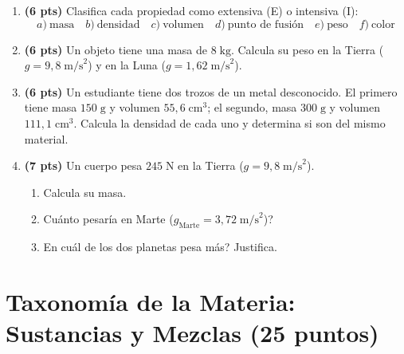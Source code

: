 \documentclass[12pt, letterpaper]{article}
\begin{document}
\begin{enumerate}[leftmargin=*]
  \item \textbf{(6 pts)} Clasifica cada propiedad como extensiva (E) o intensiva (I):
        \[
          a)\ \text{masa} \quad b)\ \text{densidad} \quad c)\ \text{volumen} \quad d)\ \text{punto de fusión} \quad e)\ \text{peso} \quad f)\ \text{color}
        \]

  \item \textbf{(6 pts)} Un objeto tiene una masa de $8\;\text{kg}$. Calcula su peso en la Tierra ($g = 9{,}8\;\text{m/s}^2$) y en la Luna ($g = 1{,}62\;\text{m/s}^2$).

  \item \textbf{(6 pts)} Un estudiante tiene dos trozos de un metal desconocido. El primero tiene masa $150\;\text{g}$ y volumen $55{,}6\;\text{cm}^3$; el segundo, masa $300\;\text{g}$ y volumen $111{,}1\;\text{cm}^3$. Calcula la densidad de cada uno y determina si son del mismo material.

  \item \textbf{(7 pts)} Un cuerpo pesa $245\;\text{N}$ en la Tierra ($g = 9{,}8\;\text{m/s}^2$).
        \begin{enumerate}[label=\alph*)]
          \item Calcula su masa.
          \item \textquestiondown Cuánto pesaría en Marte ($g_{\text{Marte}} = 3{,}72\;\text{m/s}^2$)?
          \item \textquestiondown En cuál de los dos planetas pesa más? Justifica.
        \end{enumerate}
\end{enumerate}

\newpage

\section{Taxonomía de la Materia: Sustancias y Mezclas (25 puntos)}
\end{document}
